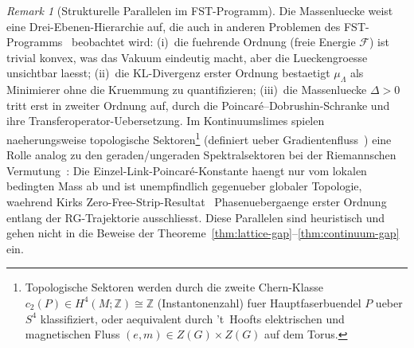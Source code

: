 \documentclass[12pt,a4paper]{article}
\theoremstyle{definition}
\theoremstyle{plain}
\theoremstyle{remark}
\newtheorem{remark}[definition]{Remark}
\begin{document}
\begin{remark}[Strukturelle Parallelen im FST-Programm]\label{rem:fst-parallels}
Die Massenluecke weist eine Drei-Ebenen-Hierarchie auf, die auch in
anderen Problemen des FST-Programms~\cite{FST-Unified2026} beobachtet wird: (i)~die
fuehrende Ordnung (freie Energie $\mathcal{F}$) ist trivial konvex, was
das Vakuum eindeutig macht, aber die Lueckengroesse unsichtbar laesst; (ii)~die
KL-Divergenz erster Ordnung bestaetigt $\mu_\Lambda$ als Minimierer ohne
die Kruemmung zu quantifizieren; (iii)~die Massenluecke $\Delta > 0$ tritt erst
in zweiter Ordnung auf, durch die Poincar\'e--Dobrushin-Schranke und ihre
Transferoperator-Uebersetzung. Im Kontinuumslimes spielen naeherungsweise
topologische Sektoren\footnote{Topologische Sektoren werden durch die zweite Chern-Klasse $c_2(P) \in H^4(M;\mathbb{Z}) \cong \mathbb{Z}$ (Instantonenzahl) fuer Hauptfaserbuendel $P$ ueber $S^4$ klassifiziert, oder aequivalent durch 't~Hoofts elektrischen und magnetischen Fluss $(e, m) \in Z(G) \times Z(G)$ auf dem Torus.} (definiert ueber Gradientenfluss~\cite{Luscher2010}) eine
Rolle analog zu den geraden/ungeraden Spektralsektoren bei der
Riemannschen Vermutung~\cite{GeigerRH2026c}: Die Einzel-Link-Poincar\'e-Konstante
haengt nur vom lokalen bedingten Mass ab und ist unempfindlich gegenueber
globaler Topologie, waehrend Kirks Zero-Free-Strip-Resultat~\cite{Kirk2026b}
Phasenuebergaenge erster Ordnung entlang der RG-Trajektorie ausschliesst.
Diese Parallelen sind heuristisch und gehen nicht in die Beweise der
Theoreme~\ref{thm:lattice-gap}--\ref{thm:continuum-gap} ein.
\end{remark}
\end{document}
